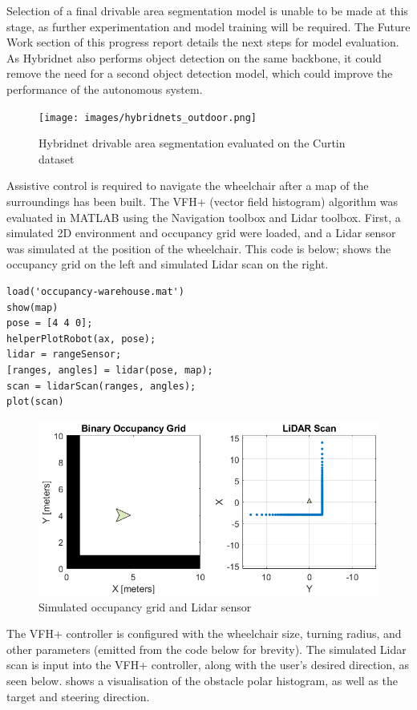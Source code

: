 Selection of a final drivable area segmentation model is unable to be made at this stage, as further experimentation and model training
will be required. The Future Work section of this progress report details the next steps for model evaluation.
As Hybridnet also performs object detection on the same backbone, it could remove the need for a second object detection model,
which could improve the performance of the autonomous system.

\begin{figure}[H]
    \centering
    \texttt{[image: images/hybridnets\_outdoor.png]}
    \caption{Hybridnet drivable area segmentation evaluated on the Curtin dataset}
    \label{fig:hybridnets_outdoor}
\end{figure}

Assistive control is required to navigate the wheelchair after a map of the surroundings has been built.
The VFH+ (vector field histogram) \cite{ulrichVFHReliableObstacle1998} algorithm was evaluated
in MATLAB using the Navigation toolbox and Lidar toolbox.
First, a simulated 2D environment and occupancy grid were loaded,
and a Lidar sensor was simulated at the position of the wheelchair. This code is below;
 shows the occupancy grid on the left and simulated
Lidar scan on the right.

\begin{verbatim}
load('occupancy-warehouse.mat')
show(map)
pose = [4 4 0];
helperPlotRobot(ax, pose);
lidar = rangeSensor;
[ranges, angles] = lidar(pose, map);
scan = lidarScan(ranges, angles);
plot(scan)
\end{verbatim}

\begin{figure}[H]
    \centering
    \includegraphics[width=0.5\linewidth]{images/simulated_lidar.png}
    \caption{Simulated occupancy grid and Lidar sensor}
    \label{fig:simulated_lidar}
\end{figure}

The VFH+ controller is configured with the wheelchair size,
turning radius, and other parameters (emitted from the code below for brevity).
The simulated Lidar scan is input into the VFH+ controller, along with
the user's desired direction, as seen below.  shows a visualisation
of the obstacle polar histogram, as well as the target and steering direction.

